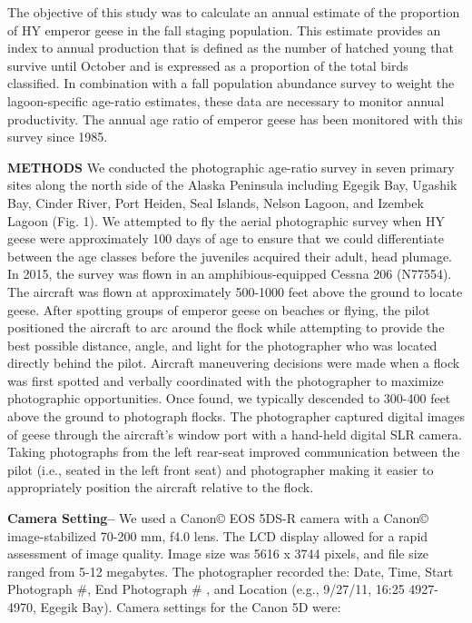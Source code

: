 \documentclass[]{article}
\begin{document}
The objective of this study was to calculate an annual estimate of the
proportion of HY emperor geese in the fall staging population. This estimate provides an index to annual production that is defined as the number
of hatched young that survive until October and is expressed as a
proportion of the total birds classified. In combination with a fall
population abundance survey to weight the lagoon-specific age-ratio
estimates, these data are necessary to monitor annual productivity. The
annual age ratio of emperor geese has been monitored with this survey
since 1985.

\textbf{METHODS}\break
We conducted the photographic age-ratio survey in seven primary sites
along the north side of the Alaska Peninsula including Egegik Bay,
Ugashik Bay, Cinder River, Port Heiden, Seal Islands, Nelson Lagoon, and
Izembek Lagoon (Fig. 1). We attempted to fly the aerial photographic
survey when HY geese were approximately 100 days of age to ensure that
we could differentiate between the age classes before the juveniles
acquired their adult, head plumage. In 2015, the survey was flown in an
amphibious-equipped Cessna 206 (N77554). The aircraft was flown at
approximately 500-1000 feet above the ground to locate geese. After
spotting groups of emperor geese on beaches or flying, the pilot
positioned the aircraft to arc around the flock while attempting to
provide the best possible distance, angle, and light for the
photographer who was located directly behind the pilot. Aircraft
maneuvering decisions were made when a flock was first spotted and
verbally coordinated with the photographer to maximize photographic
opportunities. Once found, we typically descended to 300-400 feet above
the ground to photograph flocks. The photographer captured digital
images of geese through the aircraft's window port with a hand-held
digital SLR camera. Taking photographs from the left rear-seat improved
communication between the pilot (i.e., seated in the left front seat)
and photographer making it easier to appropriately position the aircraft
relative to the flock.

\textbf{Camera Setting--} We used a Canon\copyright\hspace{1ex} EOS
5DS-R camera with a Canon\copyright\hspace{1ex} image-stabilized 70-200
mm, f4.0 lens. The LCD display allowed for a rapid assessment of image
quality. Image size was 5616 x 3744 pixels, and file size ranged from
5-12 megabytes. The photographer recorded the: Date, Time, Start
Photograph \#, End Photograph \# , and Location (e.g., 9/27/11, 16:25
4927-4970, Egegik Bay). Camera settings for the Canon 5D were:
\end{document}
